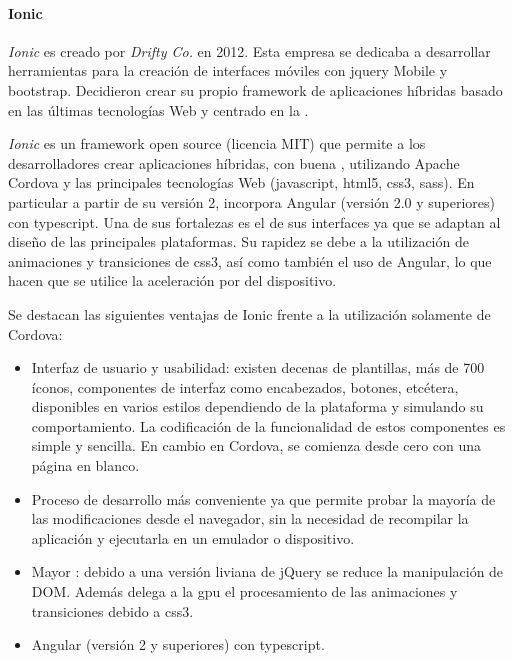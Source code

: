 \paragraph{Ionic}
\label{ionic}

\textit{Ionic} es creado por \textit{Drifty Co.} en 2012. Esta empresa se dedicaba a desarrollar herramientas para la creación de interfaces móviles con \gls{jquery} Mobile y \gls{bootstrap}. Decidieron crear su propio \gls{framework} de aplicaciones híbridas basado en las últimas tecnologías Web y centrado en la .

\textit{Ionic} es un \gls{framework} \gls{open source} (licencia MIT) que permite a los desarrolladores crear aplicaciones híbridas, con buena , utilizando Apache Cordova y las principales tecnologías Web (\gls{javascript}, \gls{html}5, \gls{css}3, sass). En particular a partir de su versión 2, incorpora Angular (versión 2.0 y superiores) con \gls{typescript}. Una de sus fortalezas es el  de sus interfaces ya que se adaptan al diseño de las principales plataformas\cite{ionic2017concepts}. Su rapidez se debe a la utilización de animaciones y transiciones de \gls{css}3, así como también el uso de Angular, lo que hacen que se utilice la aceleración por  del dispositivo\cite{hartington2017animationsIonic}.

Se destacan las siguientes ventajas de Ionic frente a la utilización solamente de Cordova\cite{noupe2016ionicvscordova}:
\begin{itemize}
\item Interfaz de usuario y usabilidad: existen decenas de plantillas, más de 700 íconos, componentes de interfaz como encabezados, botones, etcétera, disponibles en varios estilos dependiendo de la plataforma y simulando su comportamiento. La codificación de la funcionalidad de estos componentes es simple y sencilla. En cambio en Cordova, se comienza desde cero con una página en blanco.
\item Proceso de desarrollo más conveniente ya que permite probar la mayoría de las modificaciones  desde el navegador, sin la necesidad de recompilar la aplicación y ejecutarla en un emulador o dispositivo.
\item Mayor : debido a una versión liviana de jQuery se reduce la manipulación de DOM. Además delega a la \gls{gpu} el procesamiento de las animaciones y transiciones debido a \gls{css}3.
\item Angular (versión 2 y superiores) con \gls{typescript}.
\end{itemize}

